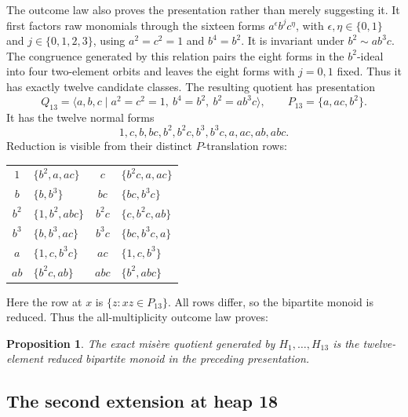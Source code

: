 \documentclass[11pt]{article}
\newtheorem{proposition}[theorem]{Proposition}
\theoremstyle{definition}
\theoremstyle{remark}
\begin{document}
The outcome law also proves the presentation rather than merely suggesting
it.  It first factors raw monomials through the sixteen forms
$a^\epsilon b^j c^\eta$, with $\epsilon,\eta\in\{0,1\}$ and
$j\in\{0,1,2,3\}$, using
$a^2=c^2=1$ and $b^4=b^2$.  It is invariant under
$b^2\sim ab^3c$.  The congruence generated by this relation pairs the eight
forms in the $b^2$-ideal into four two-element orbits and leaves the eight
forms with $j=0,1$ fixed.  Thus it has exactly twelve candidate classes.
The resulting quotient has presentation
\begin{equation}
 Q_{13}=\langle a,b,c\mid a^2=c^2=1,\ b^4=b^2,\
                 b^2=ab^3c\rangle,
 \qquad P_{13}=\{a,ac,b^2\}.
\end{equation}
It has the twelve normal forms
\[
 1,c,b,bc,b^2,b^2c,b^3,b^3c,a,ac,ab,abc.
\]
Reduction is visible from their distinct $P$-translation rows:
\begin{center}
\small
\begin{tabular}{c@{\;}l@{\qquad}c@{\;}l}
\toprule
$1$&$\{b^2,a,ac\}$&$c$&$\{b^2c,a,ac\}$\\
$b$&$\{b,b^3\}$&$bc$&$\{bc,b^3c\}$\\
$b^2$&$\{1,b^2,abc\}$&$b^2c$&$\{c,b^2c,ab\}$\\
$b^3$&$\{b,b^3,ac\}$&$b^3c$&$\{bc,b^3c,a\}$\\
$a$&$\{1,c,b^3c\}$&$ac$&$\{1,c,b^3\}$\\
$ab$&$\{b^2c,ab\}$&$abc$&$\{b^2,abc\}$\\
\bottomrule
\end{tabular}
\end{center}
Here the row at $x$ is $\{z:xz\in P_{13}\}$.  All rows differ, so the
bipartite monoid is reduced.  Thus the all-multiplicity outcome law proves:

\begin{proposition}\label{prop:grundy13}
The exact mis\`ere quotient generated by $H_1,\ldots,H_{13}$ is the
twelve-element reduced bipartite monoid in the preceding presentation.
\end{proposition}

\subsection{The second extension at heap 18}
\end{document}
